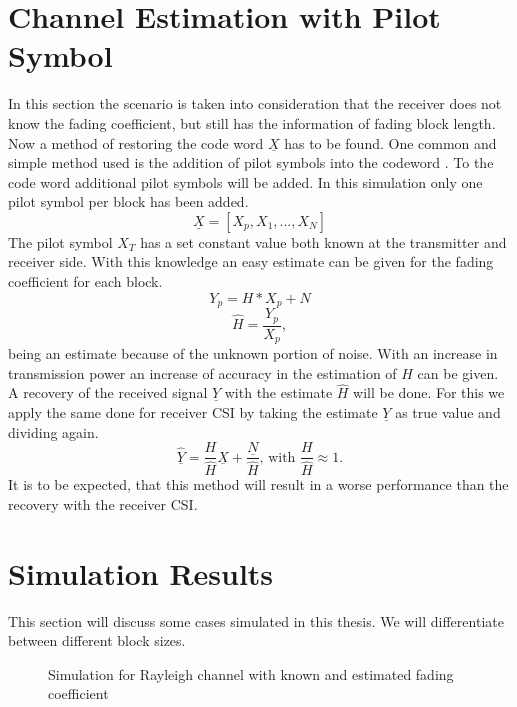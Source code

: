 \section{Channel Estimation with Pilot Symbol}
In this section the scenario is taken into consideration that the receiver does not know the fading coefficient, but still has the information of fading block length. Now a method of restoring the code word \textbf{$\underline{X}$} has to be found.
\newline
One common and simple method used is the addition of pilot symbols into the codeword \cite{Hassibi03}. To the code word additional pilot symbols will be added. In this simulation only one pilot symbol per block has been added. 
\begin{equation}
\underline{X} = [X_p, X_1, ..., X_N]
\end{equation}
The pilot symbol $X_T$ has a set constant value both known at the transmitter and receiver side. With this knowledge an easy estimate can be given for the fading coefficient for each block.
\begin{equation}
Y_p = H * X_p + N
\end{equation}
\begin{equation}
\hat{H} = \frac{Y_p}{X_p},
\end{equation}
being an estimate because of the unknown portion of noise. With an increase in transmission power an increase of accuracy in the estimation of $H$ can be given.
A recovery of the received signal \textbf{$\underline{Y}$} with the estimate {$\hat{H}$} will be done. For this we apply the same done for receiver CSI by taking the estimate \textbf{$\underline{Y}$} as true value and dividing again.
\begin{equation}
\underline{\hat{Y}} = \frac{H}{\hat{H}}\underline{X} + \frac{\underline{N}}{\hat{H}} \textrm{, with } \frac{H}{\hat{H}} \approx 1. 
\end{equation}
It is to be expected, that this method will result in a worse performance than the recovery with the receiver CSI.  

\section{Simulation Results}
This section will discuss some cases simulated in this thesis. We will differentiate between different block sizes.
\begin{figure}[!htb]
	\setlength{}
	\setlength\fheight{0.4\textheight}
	\centering
		
	\caption{Simulation for Rayleigh channel with known and estimated fading coefficient}
	\label{fig:rayferfirst}
\end{figure}


